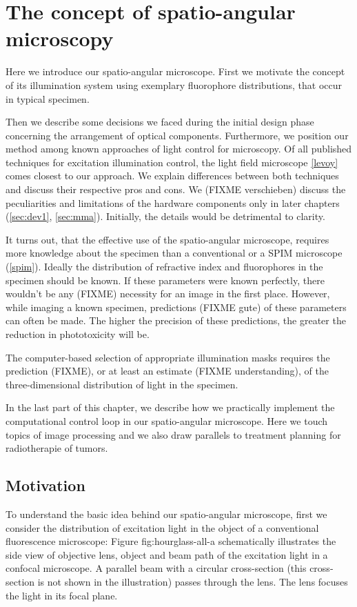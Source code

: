 \chapter{The concept of spatio-angular microscopy}
\label{sec:concept}
\begin{summary}
  Here we introduce our spatio-angular microscope. First we motivate
  the concept of its illumination system using exemplary fluorophore
  distributions, that occur in typical specimen.

  Then we describe some decisions we faced during the initial design
  phase concerning the arrangement of optical components. Furthermore,
  we position our method among known approaches of light control for
  microscopy. Of all published techniques for excitation illumination
  control, the light field microscope \ref{levoy} comes closest to our
  approach.  We explain differences between both techniques and
  discuss their respective pros and cons.  We (FIXME verschieben)
  discuss the peculiarities and limitations of the hardware components
  only in later chapters (\ref{sec:dev1}, \ref{sec:mma}).  Initially,
  the details would be detrimental to clarity.

  It turns out, that the effective use of the spatio-angular
  microscope, requires more knowledge about the specimen than a
  conventional or a SPIM microscope (\ref{spim}). Ideally the
  distribution of refractive index and fluorophores in the specimen
  should be known. If these parameters were known perfectly, there
  wouldn't be any (FIXME) necessity for an image in the first
  place. However, while imaging a known specimen, predictions (FIXME
  gute) of these parameters can often be made. The higher the
  precision of these predictions, the greater the reduction in
  phototoxicity will be.

  The computer-based selection of appropriate illumination masks
  requires the prediction (FIXME), or at least an estimate (FIXME
  understanding), of the three-dimensional distribution of light in
  the specimen.

  In the last part of this chapter, we describe how we practically
  implement the computational control loop in our spatio-angular
  microscope. Here we touch topics of image processing and we also
  draw parallels to treatment planning for radiotherapie of tumors.
\end{summary}
\section{Motivation}
To understand the basic idea behind our spatio-angular microscope,
first we consider the distribution of excitation light in the object
of a conventional fluorescence microscope: Figure fig:hourglass-all-a
schematically illustrates the side view of objective lens, object and
beam path of the excitation light in a confocal microscope. A parallel
beam with a circular cross-section (this cross-section is not shown in
the illustration) passes through the lens. The lens focuses the light
in its focal plane.

